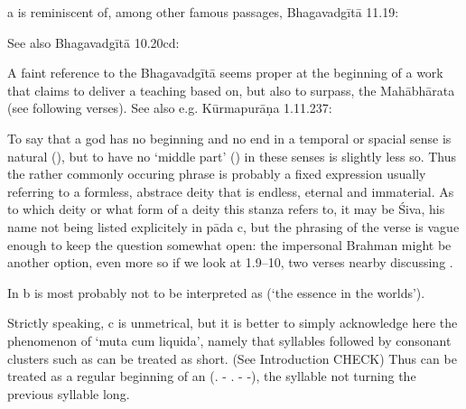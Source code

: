 {  a is reminiscent of, among other famous passages, Bhagavadgītā 11.19:  


  See also Bhagavadgītā 10.20cd: 

  \twodanda 

  A faint reference to the Bhagavadgītā seems proper at the beginning of a work that claims to deliver a teaching  based on, but also to surpass, the Mahābhārata (see following verses). See also e.g. Kūrmapurāṇa 1.11.237:  

          \twodanda 

  To say that a god has no beginning and no end in a temporal or spacial sense is natural (), but to have no `middle part' () in these senses is slightly less so.  Thus the rather commonly occuring phrase  is probably  a fixed expression usually referring to  a formless, abstrace deity that is endless, eternal and immaterial. As to which deity or what form of a deity this stanza  refers to, it may be Śiva, his name not being listed explicitely in pāda c, but the phrasing of the verse is vague enough to keep the question somewhat open: the impersonal Brahman might be another option, even more so if we look at 1.9--10, two verses nearby  discussing .                  

 In  b  is most probably not  to be interpreted as  (`the essence in the worlds').  

 Strictly speaking,  c is unmetrical, but it is better to  simply acknowledge here the phenomenon of `muta cum liquida', namely that syllables followed by consonant clusters such as   can be treated as short. (See Introduction CHECK) Thus  can be treated as a regular beginning of an  (. - . - -), the syllable   not turning the previous syllable long.  

}
